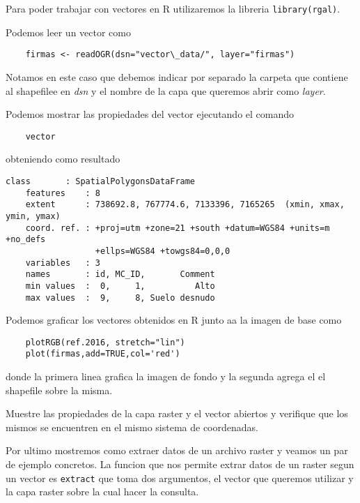 Para poder trabajar con vectores en R utilizaremos la libreria
\texttt{library(rgal)}.

\begin{exa}
    Podemos leer un vector como
    \begin{lstlisting}
    firmas <- readOGR(dsn="vector\_data/", layer="firmas")
    \end{lstlisting}
    Notamos en este caso que debemos indicar por separado la carpeta que
    contiene al shapefilee en \emph{dsn} y el nombre de la capa que queremos
    abrir como \emph{layer}.

    Podemos mostrar las propiedades del vector ejecutando el comando

    \begin{lstlisting}
    vector
    \end{lstlisting}

    obteniendo como resultado
    \begin{Verbatim}[fontsize=\small]
    class       : SpatialPolygonsDataFrame 
    features    : 8 
    extent      : 738692.8, 767774.6, 7133396, 7165265  (xmin, xmax, ymin, ymax)
    coord. ref. : +proj=utm +zone=21 +south +datum=WGS84 +units=m +no_defs
                  +ellps=WGS84 +towgs84=0,0,0 
    variables   : 3
    names       : id, MC_ID,       Comment 
    min values  :  0,     1,          Alto 
    max values  :  9,     8, Suelo desnudo 
    \end{Verbatim}  

    Podemos graficar los vectores obtenidos en R junto aa la imagen de base como

    \begin{lstlisting}
    plotRGB(ref.2016, stretch="lin")
    plot(firmas,add=TRUE,col='red')
    \end{lstlisting}
    donde la primera linea grafica la imagen de fondo y la segunda agrega el
    el shapefile sobre la misma.
\end{exa}

\begin{act} 
    Muestre las propiedades de la capa raster y el vector abiertos y verifique
    que los mismos se encuentren en el mismo sistema de coordenadas.
\end{act}

Por ultimo mostremos como extraer datos de un archivo raster y veamos un par de
ejemplo concretos. La funcion que nos permite extrar datos de un raster segun
un vector es \texttt{extract} que toma dos argumentos, el vector que queremos
utilizar y la capa raster sobre la cual hacer la consulta.

